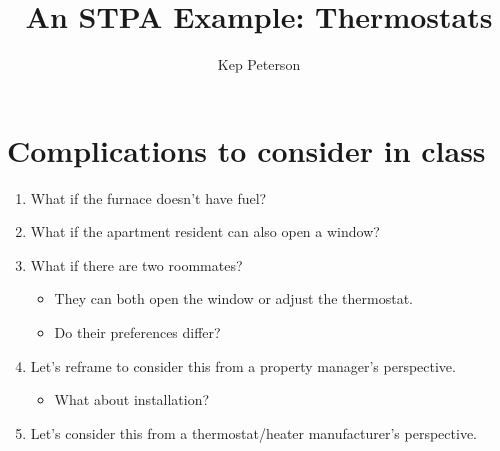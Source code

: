 \documentclass[a4paper]{tufte-handout}
\title{An STPA Example: Thermostats}
\author{Kep Peterson}
\begin{document}
\setlength{\parindent}{0em}
\setlength{\parskip}{1em}

\section{Complications to consider in class}

\begin{fullwidth}
  
\begin{enumerate}
\item What if the furnace doesn't have fuel?
\item What if the apartment resident can also open a window?
\item What if there are two roommates?
  \begin{itemize}
  \item They can both open the window or adjust the thermostat.
  \item Do their preferences differ?
  \end{itemize}
\item Let's reframe to consider this from a property manager's perspective.
  \begin{itemize}
  \item What about installation?
  \end{itemize}
  \item Let's consider this from a thermostat/heater manufacturer's perspective.
\end{enumerate}

\end{fullwidth}
\end{document}
